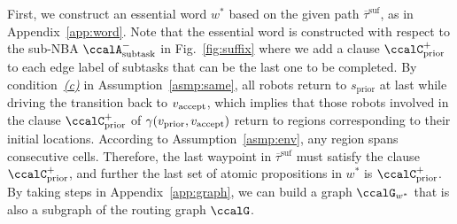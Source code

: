\documentclass[Afour,sageh,times]{sagej}
\newcommand{\auto}[1]{\ccalA_{\textup{#1}}}
\newcommand{\vertex}[1]{v_{\textup{#1}}}
\begin{document}
{{First, we construct an essential word $w^*$ based on the given path $\overline{\tau}^{\text{suf}}$, as in Appendix~\ref{app:word}.  Note that the essential word is constructed with respect to the sub-NBA $\auto{subtask}^-$ in Fig.~\ref{fig:suffix} where we add a  clause $\ccalC_{\text{prior}}^+$ to each edge label of subtasks that can be the last one to be completed. By condition~\hyperref[asmp:c]{\it (c)} in Assumption~\ref{asmp:same}, all robots return to  $s_{\text{prior}}$ at last while driving the transition back to $\vertex{accept}$, which implies that those robots involved in the clause $\ccalC^+_{\text{prior}}$ of $\gamma(\vertex{prior}, \vertex{accept})$ return to regions corresponding to their initial locations. According to Assumption~\ref{asmp:env}, any region spans consecutive cells. Therefore, the last waypoint in $\overline{\tau}^{\text{suf}}$ must satisfy the clause $\ccalC_{\text{prior}}^+$, and further the last set of atomic propositions in $w^*$ is $\ccalC_{\text{prior}}^+$. By taking steps in Appendix~\ref{app:graph}, we can build a graph $\ccalG_{w^*}$ that is also a subgraph of the routing graph $\ccalG$.

}}
\end{document}
